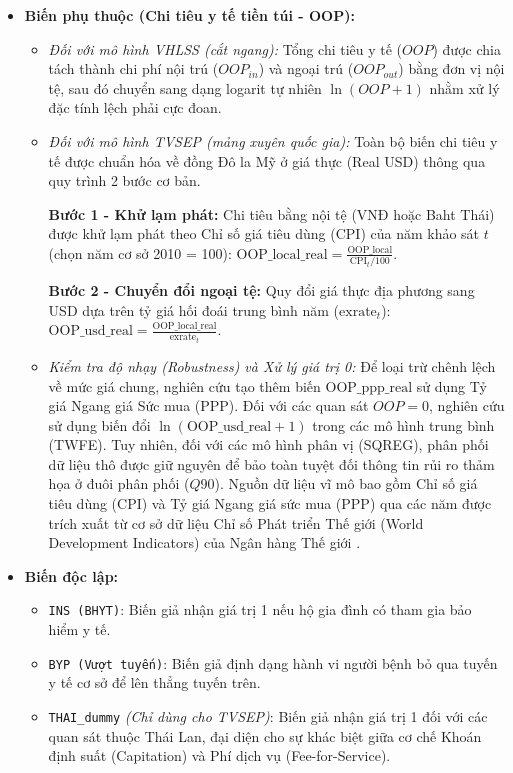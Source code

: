 \documentclass[12pt,a4paper]{article}
\begin{document}
\begin{itemize}
	\item \textbf{Biến phụ thuộc (Chi tiêu y tế tiền túi - OOP):} 
	\begin{itemize}
		\item \textit{Đối với mô hình VHLSS (cắt ngang):} Tổng chi tiêu y tế ($OOP$) được chia tách thành chi phí nội trú ($OOP_{in}$) và ngoại trú ($OOP_{out}$) bằng đơn vị nội tệ, sau đó chuyển sang dạng logarit tự nhiên $\ln(OOP + 1)$ nhằm xử lý đặc tính lệch phải cực đoan.
		\item \textit{Đối với mô hình TVSEP (mảng xuyên quốc gia):} Toàn bộ biến chi tiêu y tế được chuẩn hóa về đồng Đô la Mỹ ở giá thực (Real USD) thông qua quy trình 2 bước cơ bản. 
		
		\textbf{Bước 1 - Khử lạm phát:} Chi tiêu bằng nội tệ (VNĐ hoặc Baht Thái) được khử lạm phát theo Chỉ số giá tiêu dùng (CPI) của năm khảo sát $t$ (chọn năm cơ sở 2010 = 100): $\text{OOP\_local\_real} = \frac{\text{OOP\_local}}{\text{CPI}_{t}/100}$. 
		
		\textbf{Bước 2 - Chuyển đổi ngoại tệ:} Quy đổi giá thực địa phương sang USD dựa trên tỷ giá hối đoái trung bình năm ($\text{exrate}_{t}$): $\text{OOP\_usd\_real} = \frac{\text{OOP\_local\_real}}{\text{exrate}_{t}}$. 
		
		\item \textit{Kiểm tra độ nhạy (Robustness) và Xử lý giá trị 0:} Để loại trừ chênh lệch về mức giá chung, nghiên cứu tạo thêm biến $\text{OOP\_ppp\_real}$ sử dụng Tỷ giá Ngang giá Sức mua (PPP). Đối với các quan sát $OOP = 0$, nghiên cứu sử dụng biến đổi $\ln(\text{OOP\_usd\_real} + 1)$ trong các mô hình trung bình (TWFE). Tuy nhiên, đối với các mô hình phân vị (SQREG), phân phối dữ liệu thô được giữ nguyên để bảo toàn tuyệt đối thông tin rủi ro thảm họa ở đuôi phân phối ($Q90$). Nguồn dữ liệu vĩ mô bao gồm Chỉ số giá tiêu dùng (CPI) và Tỷ giá Ngang giá sức mua (PPP) qua các năm được trích xuất từ cơ sở dữ liệu Chỉ số Phát triển Thế giới (World Development Indicators) của Ngân hàng Thế giới \parencite{worldbank_ppp}.
		
	\end{itemize}
	
	\item \textbf{Biến độc lập:}
	\begin{itemize}
		\item \texttt{INS (BHYT)}: Biến giả nhận giá trị 1 nếu hộ gia đình có tham gia bảo hiểm y tế.
		\item \texttt{BYP (Vượt tuyến)}: Biến giả định dạng hành vi người bệnh bỏ qua tuyến y tế cơ sở để lên thẳng tuyến trên.
		\item \texttt{THAI\_dummy} \textit{(Chỉ dùng cho TVSEP)}: Biến giả nhận giá trị 1 đối với các quan sát thuộc Thái Lan, đại diện cho sự khác biệt giữa cơ chế Khoán định suất (Capitation) và Phí dịch vụ (Fee-for-Service).
	\end{itemize}
	

\end{itemize}
\end{document}
